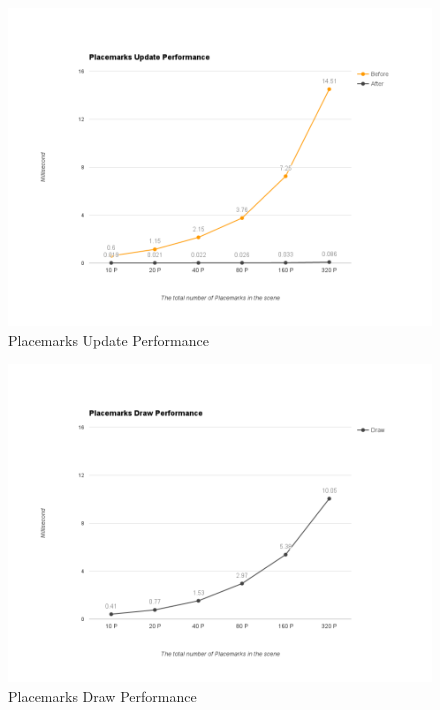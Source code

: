 \begin{figure}[H]
	\caption{Placemarks Update Performance}
	\label{fig:placemarks-update-performance}
	\centering
	\includegraphics[width=\textwidth, keepaspectratio]{Figures/placemarks-update-performance.png}
	\decoRule
\end{figure}



\begin{figure}[H]
	\caption{Placemarks Draw Performance}
	\label{fig:placemarks-draw-performance}
	\centering
	\includegraphics[width=\textwidth, keepaspectratio]{Figures/placemarks-draw-performance.png}
	\decoRule
\end{figure}




